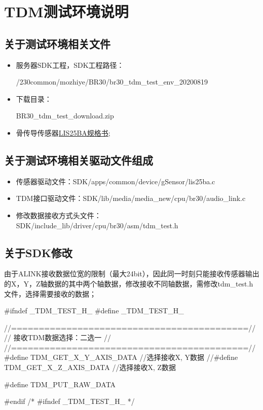 \section{TDM测试环境说明}
\subsection{关于测试环境相关文件}
\begin{itemize}
\item 服务器SDK工程，SDK工程路径：
\begin{messagebox}
/230common/mozhiye/BR30/br30_tdm_test_env_20200819
\end{messagebox}
\item 下载目录：
\begin{messagebox}
BR30_tdm_test_download.zip
\end{messagebox}
\item 骨传导传感器\href{https://www.st.com/resource/en/datasheet/lis25ba.pdf}{LIS25BA规格书};
\end{itemize}

\subsection{关于测试环境相关驱动文件组成}
\begin{itemize}
\item 传感器驱动文件：SDK/apps/common/device/gSensor/lis25ba.c
\item TDM接口驱动文件：SDK/lib/media/media\_new/cpu/br30/audio\_link.c
\item 修改数据接收方式头文件：SDK/include\_lib/driver/cpu/br30/asm/tdm\_test.h
\end{itemize}

\subsection{关于SDK修改}
由于ALINK接收数据位宽的限制（最大24bit），因此同一时刻只能接收传感器输出的X，Y，Z轴数据的其中两个轴数据，修改接收不同轴数据，需修改tdm\_test.h文件，选择需要接收的数据；
\begin{myccode}[caption={tdm\_test.h}]
#ifndef _TDM_TEST_H_
#define _TDM_TEST_H_

//===========================================//
//              接收TDM数据选择：二选一      //
//===========================================//
#define TDM_GET_X_Y_AXIS_DATA 		//选择接收X, Y数据
//#define TDM_GET_X_Z_AXIS_DATA     //选择接收X, Z数据

#define TDM_PUT_RAW_DATA

#endif /* #ifndef _TDM_TEST_H_ */
\end{myccode}

